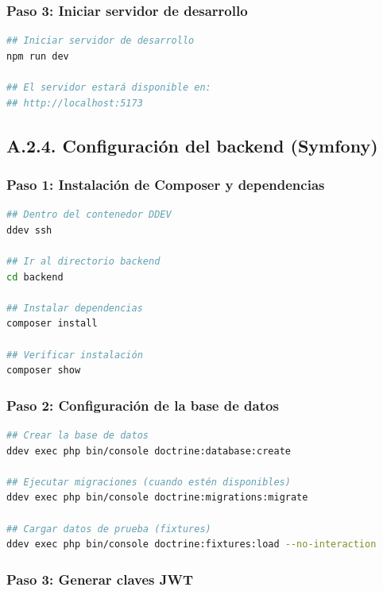 \documentclass[12pt,a4paper,oneside]{report}
\begin{document}
\subsubsection{Paso 3: Iniciar servidor de
desarrollo}\label{paso-3-iniciar-servidor-de-desarrollo}

\begin{lstlisting}[language=bash]
## Iniciar servidor de desarrollo
npm run dev

## El servidor estará disponible en:
## http://localhost:5173
\end{lstlisting}

\subsection{A.2.4. Configuración del backend
(Symfony)}\label{a.2.4.-configuraciuxf3n-del-backend-symfony}

\subsubsection{Paso 1: Instalación de Composer y
dependencias}\label{paso-1-instalaciuxf3n-de-composer-y-dependencias}

\begin{lstlisting}[language=bash]
## Dentro del contenedor DDEV
ddev ssh

## Ir al directorio backend
cd backend

## Instalar dependencias
composer install

## Verificar instalación
composer show
\end{lstlisting}

\subsubsection{Paso 2: Configuración de la base de
datos}\label{paso-2-configuraciuxf3n-de-la-base-de-datos}

\begin{lstlisting}[language=bash]
## Crear la base de datos
ddev exec php bin/console doctrine:database:create

## Ejecutar migraciones (cuando estén disponibles)
ddev exec php bin/console doctrine:migrations:migrate

## Cargar datos de prueba (fixtures)
ddev exec php bin/console doctrine:fixtures:load --no-interaction
\end{lstlisting}

\subsubsection{Paso 3: Generar claves
JWT}\label{paso-3-generar-claves-jwt}
\end{document}
